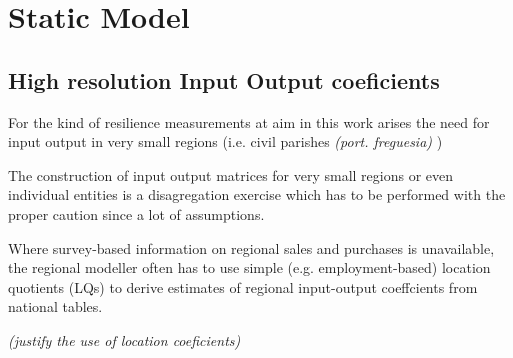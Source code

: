 \section{Static Model}

\subsection{High resolution Input Output coeficients}
For the kind of resilience measurements at aim in this work arises the need for
input output in very small regions (i.e. civil parishes \textit{(port. freguesia)} ) 


The construction of input output matrices for very small regions or even
individual entities is a disagregation exercise which has to be performed with
the proper caution since a lot of assumptions. 


Where survey-based information on regional sales and purchases is unavailable,
the regional modeller often has to use simple (e.g. employment-based) location
quotients (LQs) to derive estimates of regional input-output coeffcients from national
tables.


\emph{(justify the use of location coeficients)}


 


